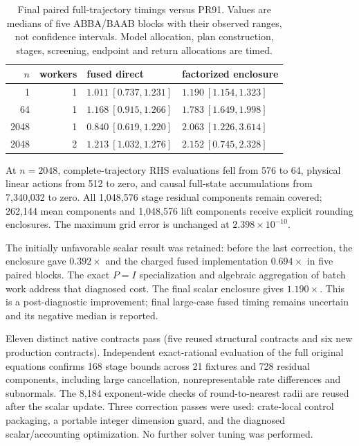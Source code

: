 \begin{table}[tb]
\caption{Final paired full-trajectory timings versus PR91. Values are medians of five ABBA/BAAB blocks with their observed ranges, not confidence intervals. Model allocation, plan construction, stages, screening, endpoint and return allocations are timed.}
\begin{ruledtabular}
\begin{tabular}{rrll}
$n$ & workers & fused direct & factorized enclosure\\
\hline
1 & 1 & $1.011\ [0.737,1.231]$ & $1.190\ [1.154,1.323]$\\
64 & 1 & $1.168\ [0.915,1.266]$ & $1.783\ [1.649,1.998]$\\
2048 & 1 & $0.840\ [0.619,1.220]$ & $2.063\ [1.226,3.614]$\\
2048 & 2 & $1.213\ [1.032,1.276]$ & $2.152\ [0.745,2.328]$\\
\end{tabular}
\end{ruledtabular}
\label{tab:structural-closure}
\end{table}

At $n=2048$, complete-trajectory RHS evaluations fell from 576 to 64, physical linear actions from 512 to zero, and causal full-state accumulations from 7,340,032 to zero. All 1,048,576 stage residual components remain covered; 262,144 mean components and 1,048,576 lift components receive explicit rounding enclosures. The maximum grid error is unchanged at $2.398\times10^{-10}$.

The initially unfavorable scalar result was retained: before the last correction, the enclosure gave $0.392\times$ and the charged fused implementation $0.694\times$ in five paired blocks. The exact $P=I$ specialization and algebraic aggregation of batch work address that diagnosed cost. The final scalar enclosure gives $1.190\times$. This is a post-diagnostic improvement; final large-case fused timing remains uncertain and its negative median is reported.

Eleven distinct native contracts pass (five reused structural contracts and six new production contracts). Independent exact-rational evaluation of the full original equations confirms 168 stage bounds across 21 fixtures and 728 residual components, including large cancellation, nonrepresentable rate differences and subnormals. The 8,184 exponent-wide checks of round-to-nearest radii are reused after the scalar update. Three correction passes were used: crate-local control packaging, a portable integer dimension guard, and the diagnosed scalar/accounting optimization. No further solver tuning was performed.

